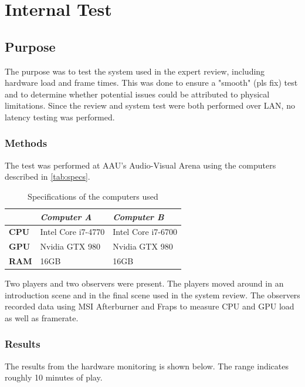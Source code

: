 \chapter*{Internal Test}

\section*{Purpose}

The purpose was to test the system used in the expert review, including hardware load and frame times. This was done to ensure a "smooth" (pls fix) test and to determine whether potential issues could be attributed to physical limitations. Since the review and system test were both performed over LAN, no latency testing was performed.

\subsection*{Methods}

The test was performed at AAU's Audio-Visual Arena using the computers described in \autoref{tab:specs}. 

\begin{table}
\centering
\begin{tabularx}{0.48\textwidth}{X X X}
\toprule
                     & \textit{Computer A} & \textit{Computer B} \\ \midrule \rowcolor{lightGrey}
\textbf{CPU}         & Intel Core i7-4770  & Intel Core i7-6700  \\

\textbf{GPU}         & Nvidia GTX 980      & Nvidia GTX 980    \\  \rowcolor{lightGrey}

\textbf{RAM} 		 & 16GB                & 16GB                 \\ \toprule
\end{tabularx}
\caption{Specifications of the computers used}
\label{tab:specs}
\end{table}

Two players and two observers were present. The players moved around in an introduction scene and in the final scene used in the system review. The observers recorded data using MSI Afterburner and Fraps to measure CPU and GPU load as well as framerate.

\subsection*{Results}
The results from the hardware monitoring is shown below. The range indicates roughly 10 minutes of play. 

